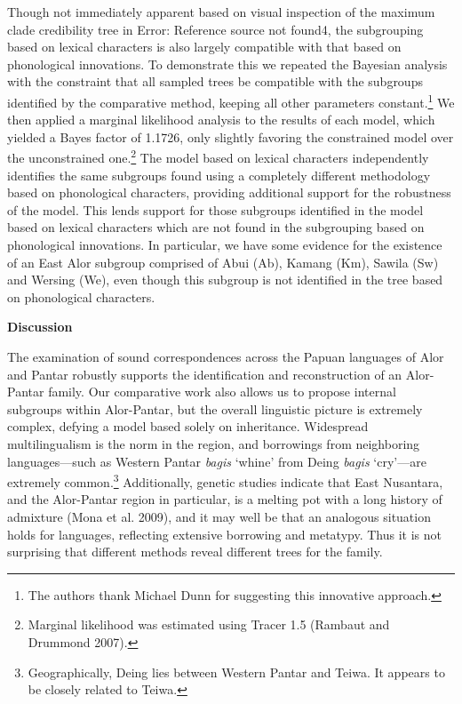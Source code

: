 Though not immediately apparent based on visual inspection of the maximum clade credibility tree in Error: Reference source not found4, the subgrouping based on lexical characters is also largely compatible with that based on phonological innovations. To demonstrate this we repeated the Bayesian analysis with the constraint that all sampled trees be compatible with the subgroups identified by the comparative method, keeping all other parameters constant.\footnote{ The authors thank Michael Dunn for suggesting this innovative approach. } We then applied a marginal likelihood analysis to the results of each model, which yielded a Bayes factor of 1.1726, only slightly favoring the constrained model over the unconstrained one.\footnote{ Marginal likelihood was estimated using Tracer 1.5 (Rambaut and Drummond 2007).} The model based on lexical characters independently identifies the same subgroups found using a completely different methodology based on phonological characters, providing additional support for the 
robustness of the model. This lends support for those subgroups identified in the model based on lexical characters which are not found in the subgrouping based on phonological innovations. In particular, we have some evidence for the existence of an East Alor subgroup comprised of Abui (Ab), Kamang (Km), Sawila (Sw) and Wersing (We), even though this subgroup is not identified in the tree based on phonological characters. 

{\bfseries
\hypertarget{RefHeading49935871885726}{}Discussion}

The examination of sound correspondences across the Papuan languages of Alor and Pantar robustly supports the identification and reconstruction of an Alor-Pantar family. Our comparative work also allows us to propose internal subgroups within Alor-Pantar, but the overall linguistic picture is extremely complex, defying a model based solely on inheritance. Widespread multilingualism is the norm in the region, and borrowings from neighboring languages---such as Western Pantar \textit{bagis }{\textquoteleft}whine{\textquoteright} from Deing \textit{bagis }{\textquoteleft}cry{\textquoteright}---are extremely common.\footnote{ Geographically, Deing lies between Western Pantar and Teiwa. It appears to be closely related to Teiwa. } Additionally, genetic studies indicate that East Nusantara, and the Alor-Pantar region in particular, is a melting pot with a long history of admixture (Mona et al. 2009), and it may well be that an analogous situation holds for languages, reflecting extensive borrowing and metatypy. 
Thus it is not surprising that different methods reveal different trees for the family. 

